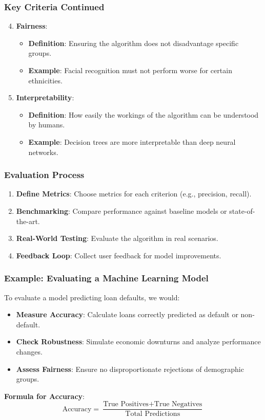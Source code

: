 \documentclass[aspectratio=169]{beamer}
\begin{document}
\begin{frame}[fragile]
    \frametitle{Key Criteria Continued}
    \begin{enumerate}
        \setcounter{enumi}{3}
        \item \textbf{Fairness}:
            \begin{itemize}
                \item \textbf{Definition}: Ensuring the algorithm does not disadvantage specific groups.
                \item \textbf{Example}: Facial recognition must not perform worse for certain ethnicities.
            \end{itemize}
        
        \item \textbf{Interpretability}:
            \begin{itemize}
                \item \textbf{Definition}: How easily the workings of the algorithm can be understood by humans.
                \item \textbf{Example}: Decision trees are more interpretable than deep neural networks.
            \end{itemize}
    \end{enumerate}
\end{frame}

\begin{frame}[fragile]
    \frametitle{Evaluation Process}
    \begin{enumerate}
        \item \textbf{Define Metrics}: Choose metrics for each criterion (e.g., precision, recall).
        \item \textbf{Benchmarking}: Compare performance against baseline models or state-of-the-art.
        \item \textbf{Real-World Testing}: Evaluate the algorithm in real scenarios.
        \item \textbf{Feedback Loop}: Collect user feedback for model improvements.
    \end{enumerate}
\end{frame}

\begin{frame}[fragile]
    \frametitle{Example: Evaluating a Machine Learning Model}
    To evaluate a model predicting loan defaults, we would:
    \begin{itemize}
        \item \textbf{Measure Accuracy}: Calculate loans correctly predicted as default or non-default.
        \item \textbf{Check Robustness}: Simulate economic downturns and analyze performance changes.
        \item \textbf{Assess Fairness}: Ensure no disproportionate rejections of demographic groups.
    \end{itemize}
    
    \textbf{Formula for Accuracy}:
    \begin{equation}
        \text{Accuracy} = \frac{\text{True Positives} + \text{True Negatives}}{\text{Total Predictions}}
    \end{equation}
\end{frame}
\end{document}
